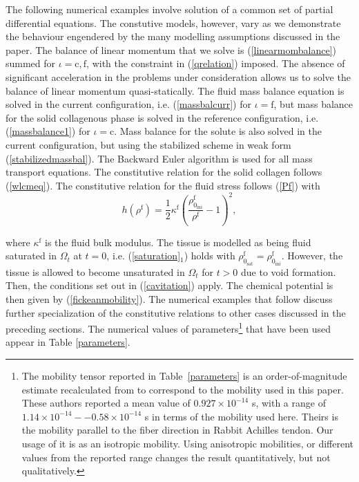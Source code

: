 The following numerical examples involve solution of a common set of
partial differential equations. The constutive models, however, vary as we
demonstrate the behaviour engendered by the many modelling
assumptions discussed in the paper. The balance of linear momentum
that we solve is (\ref{linearmombalance}) summed for $\iota =
\mathrm{c,f}$, with the constraint in (\ref{qrelation}) imposed. The
absence of significant acceleration in the problems under 
consideration allows us to solve the balance of linear momentum   
quasi-statically. The fluid mass balance equation is solved in the current
configuration, i.e. (\ref{massbalcurr}) for $\iota = \mathrm{f}$, but 
mass balance for the solid collagenous phase is solved in the
reference configuration, i.e. (\ref{massbalance1}) for $\iota =
\mathrm{c}$.  Mass balance for the solute is also solved in the
current configuration, but using the stabilized scheme in weak
form (\ref{stabilizedmassbal}). The Backward 
Euler algorithm is used for all mass transport equations. The
constitutive relation for the solid collagen follows
(\ref{wlcmeq}). The constitutive relation for the fluid stress follows
(\ref{Pf}) with 
\begin{equation}
h(\rho^\mathrm{f}) =
\frac{1}{2}\kappa^\mathrm{f}\left(\frac{\rho_{0_\mathrm{ini}}^\mathrm{f}}{\rho^\mathrm{f}}
- 1\right)^2,
\end{equation}

\noindent where $\kappa^\mathrm{f}$ is the fluid bulk modulus. The
tissue is modelled as being fluid saturated in $\Omega_t$ at $t = 0$,
i.e. (\ref{saturation}$_1$) holds with
$\rho^\mathrm{f}_{0_\mathrm{sat}} =
\rho^\mathrm{f}_{0_\mathrm{ini}}$. However, the tissue is allowed to 
become unsaturated in $\Omega_t$ for $t > 0$ due to void formation. Then,
the conditions set out in (\ref{cavitation})
apply. The chemical potential is then given by
(\ref{fickeanmobility}). The numerical examples that follow discuss further
specialization of the constitutive relations to other cases discussed
in the preceding sections. The numerical values of parameters\footnote{The
  mobility tensor reported in Table~\ref{parameters} is an
  order-of-magnitude estimate 
  recalculated from \citet{Hanetal:2000} to correspond to the 
  mobility used in this paper. These authors reported a mean value of
  $0.927\times 10^{-14}$ s, with a range of $1.14\times
  10^{-14}--0.58\times 10^{-14}$ s in terms of the mobility used
  here. Theirs is the mobility parallel to the fiber direction in
  Rabbit Achilles tendon. Our usage of it is as an isotropic
  mobility. Using anisotropic mobilities, or different values from the
  reported range changes the result
  quantitatively, but not qualitatively.}  that
have been used appear in Table \ref{parameters}.


